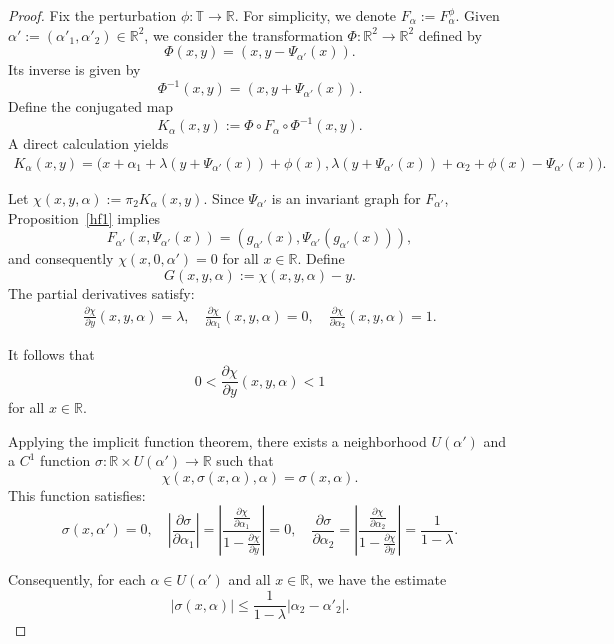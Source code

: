\documentclass[10pt,a4paper]{amsart}
\newcommand{\R}{\mathbb{R}}
\newcommand{\T}{\mathbb{T}}
\begin{document}
\begin{proof}
Fix the perturbation $\phi:\T\to\R$. For simplicity, we denote $F_\alpha := F^{\phi}_\alpha$. Given $\alpha' := (\alpha'_1, \alpha'_2) \in \R^2$, we consider the transformation $\Phi:\R^2\to\R^2$ defined by
\[
\Phi(x,y) = (x, y - \Psi_{\alpha'}(x)).
\]
Its inverse is given by
\[
\Phi^{-1}(x,y) = (x, y + \Psi_{\alpha'}(x)).
\]
Define the conjugated map
\[
K_{\alpha}(x,y) := \Phi \circ F_\alpha \circ \Phi^{-1}(x,y).
\]
A direct calculation yields
\begin{align*}
K_{\alpha}(x,y) = \biggl(x +  \alpha_1+\lambda(y + \Psi_{\alpha'}(x)) +\phi(x), \lambda(y + \Psi_{\alpha'}(x)) + \alpha_2 + \phi(x) - \Psi_{\alpha'}(x)\biggr).
\end{align*}

Let $\chi(x,y,\alpha) := \pi_2 K_\alpha(x,y)$. Since $\Psi_{\alpha'}$ is an invariant graph for $F_{\alpha'}$, Proposition~\ref{hf1} implies
\[
F_{\alpha'}(x, \Psi_{\alpha'}(x)) = (g_{\alpha'}(x), \Psi_{\alpha'}(g_{\alpha'}(x))),
\]
and consequently $\chi(x,0,\alpha') = 0$ for all $x \in \R$. Define
\[
G(x,y,\alpha) := \chi(x,y,\alpha) - y.
\]
The partial derivatives satisfy:
\begin{align}
\frac{\partial \chi}{\partial y}(x,y,\alpha) = \lambda,\quad \frac{\partial \chi}{\partial \alpha_1}(x,y,\alpha) = 0,\quad \frac{\partial \chi}{\partial \alpha_2}(x,y,\alpha) = 1.
\end{align}

It follows that
\begin{equation}\label{contrpo}
0 < \frac{\partial \chi}{\partial y}(x,y,\alpha)  < 1
\end{equation}
for all $x \in \R$.

Applying the implicit function theorem, there exists a neighborhood $U(\alpha')$ and a $C^1$ function $\sigma:\R \times U(\alpha') \to \R$ such that
\[
\chi(x, \sigma(x, \alpha), \alpha) = \sigma(x, \alpha).
\]
This function satisfies:
\begin{equation}
 \sigma(x, \alpha') = 0,\quad
\left|\frac{\partial \sigma}{\partial \alpha_1}\right| = \left|\frac{\frac{\partial \chi}{\partial \alpha_1}}{1 - \frac{\partial \chi}{\partial y}}\right|=0,\quad
\frac{\partial \sigma}{\partial \alpha_2}= \left|\frac{\frac{\partial \chi}{\partial \alpha_2}}{1 - \frac{\partial \chi}{\partial y}}\right|=\frac{1}{1-\lambda}.
\end{equation}

Consequently, for each $\alpha \in U(\alpha')$ and all $x \in \R$, we have the estimate
\[
|\sigma(x, \alpha)| \leq \frac{1}{1-\lambda}|\alpha_2 - \alpha'_2|.
\]



\end{proof}
\end{document}
